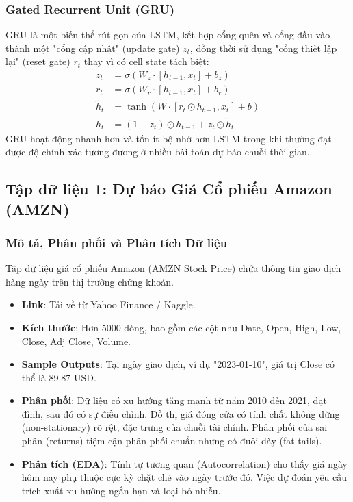 \subsubsection{Gated Recurrent Unit (GRU)}
GRU là một biến thể rút gọn của LSTM, kết hợp cổng quên và cổng đầu vào thành một "cổng cập nhật" (update gate) $z_t$, đồng thời sử dụng "cổng thiết lập lại" (reset gate) $r_t$ thay vì có cell state tách biệt:
\begin{align}
    z_t &= \sigma(W_z \cdot [h_{t-1}, x_t] + b_z) \\
    r_t &= \sigma(W_r \cdot [h_{t-1}, x_t] + b_r) \\
    \tilde{h}_t &= \tanh(W \cdot [r_t \odot h_{t-1}, x_t] + b) \\
    h_t &= (1 - z_t) \odot h_{t-1} + z_t \odot \tilde{h}_t
\end{align}
GRU hoạt động nhanh hơn và tốn ít bộ nhớ hơn LSTM trong khi thường đạt được độ chính xác tương đương ở nhiều bài toán dự báo chuỗi thời gian.

\newpage
\subsection{Tập dữ liệu 1: Dự báo Giá Cổ phiếu Amazon (AMZN)}

\subsubsection{Mô tả, Phân phối và Phân tích Dữ liệu}
Tập dữ liệu giá cổ phiếu Amazon (AMZN Stock Price) chứa thông tin giao dịch hàng ngày trên thị trường chứng khoán. 
\begin{itemize}
    \item \textbf{Link}: Tải về từ Yahoo Finance / Kaggle.
    \item \textbf{Kích thước}: Hơn 5000 dòng, bao gồm các cột như Date, Open, High, Low, Close, Adj Close, Volume.
    \item \textbf{Sample Outputs}: Tại ngày giao dịch, ví dụ "2023-01-10", giá trị Close có thể là 89.87 USD.
    \item \textbf{Phân phối}: Dữ liệu có xu hướng tăng mạnh từ năm 2010 đến 2021, đạt đỉnh, sau đó có sự điều chỉnh. Đồ thị giá đóng cửa có tính chất không dừng (non-stationary) rõ rệt, đặc trưng của chuỗi tài chính. Phân phối của sai phân (returns) tiệm cận phân phối chuẩn nhưng có đuôi dày (fat tails).
    \item \textbf{Phân tích (EDA)}: Tính tự tương quan (Autocorrelation) cho thấy giá ngày hôm nay phụ thuộc cực kỳ chặt chẽ vào ngày trước đó. Việc dự đoán yêu cầu trích xuất xu hướng ngắn hạn và loại bỏ nhiễu.
\end{itemize}

